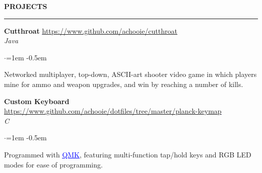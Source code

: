 \documentclass[10pt, a4paper]{article}
\newenvironment{aSection}[1]{
    \medskip \textbf{\uppercase{#1}}
    \smallskip
    \hrule
    \begin{list}{}{
            \setlength{\leftmargin}{1.5em}
        }
    \item[]
    }{
    \end{list}
}
\newenvironment{aSubsection}[4]{
    {#1} \hfill {#2} \\
    \textit{#3} \hfill \textit{#4}
    \smallskip
    \begin{list}{$\cdot$}{\leftmargin=1em}
    \itemsep -0.5em \vspace{-0.5em}
    }{
    \end{list}
    \vspace{0.5em}
}
\begin{document}
\begin{aSection}{Projects}
    \begin{aSubsection}
        {\textbf{Cutthroat}}
        {\textcolor{blue}{\underline{\url{https://www.github.com/achooie/cutthroat}}}}
        {Java}{}
    \item[] Networked multiplayer, top-down, ASCII-art shooter video game in which players mine for
        ammo and weapon upgrades, and win by reaching a number of kills.
    \end{aSubsection}

    \begin{aSubsection}
        {\textbf{Custom Keyboard}}
        {\textcolor{blue}{\underline{
            \url{https://www.github.com/achooie/dotfiles/tree/master/planck-keymap}
        }}}
        {C}{}
    \item[] Programmed with
        \href{https://github.com/qmk/qmk_firmware}{\textcolor{blue}{\underline{QMK}}}, featuring
        multi-function tap/hold keys and RGB LED modes for ease of programming.
    \end{aSubsection}
\end{aSection}
\end{document}

